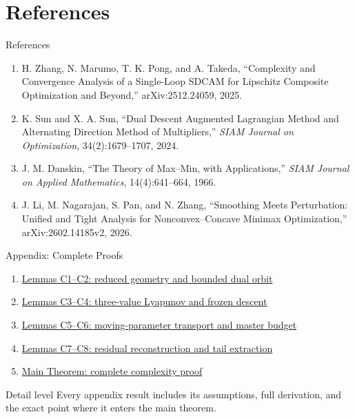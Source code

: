 \documentclass[handout,compress,9pt]{beamer}
\begin{document}
\section{References}

\begin{frame}{References}
\footnotesize
\begin{enumerate}
  \item[{[1]}] H. Zhang, N. Marumo, T. K. Pong, and A. Takeda,
  ``Complexity and Convergence Analysis of a Single-Loop SDCAM for
  Lipschitz Composite Optimization and Beyond,'' arXiv:2512.24059, 2025.

  \item[{[2]}] K. Sun and X. A. Sun,
  ``Dual Descent Augmented Lagrangian Method and Alternating Direction
  Method of Multipliers,'' \emph{SIAM Journal on Optimization},
  34(2):1679--1707, 2024.

  \item[{[3]}] J. M. Danskin,
  ``The Theory of Max--Min, with Applications,''
  \emph{SIAM Journal on Applied Mathematics},
  14(4):641--664, 1966.

  \item[{[4]}] J. Li, M. Nagarajan, S. Pan, and N. Zhang,
  ``Smoothing Meets Perturbation: Unified and Tight Analysis for
  Nonconvex--Concave Minimax Optimization,'' arXiv:2602.14185v2, 2026.
\end{enumerate}
\end{frame}

\appendix

\begin{frame}{Appendix: Complete Proofs}
\hypertarget{appendix:contents}{}
\small
\begin{enumerate}
  \item \hyperlink{appendix:candidate-geometry}{Lemmas C1--C2: reduced geometry and bounded dual orbit}
  \item \hyperlink{appendix:candidate-frozen}{Lemmas C3--C4: three-value Lyapunov and frozen descent}
  \item \hyperlink{appendix:candidate-transport}{Lemmas C5--C6: moving-parameter transport and master budget}
  \item \hyperlink{appendix:candidate-residual}{Lemmas C7--C8: residual reconstruction and tail extraction}
  \item \hyperlink{appendix:candidate-main-theorem}{Main Theorem: complete complexity proof}
\end{enumerate}
\begin{block}{Detail level}
Every appendix result includes its assumptions, full derivation, and the exact point where it enters the main theorem.
\end{block}
\end{frame}
\end{document}
